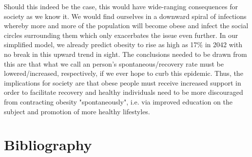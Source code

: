 \documentclass[11pt]{article}
\begin{document}
Should this indeed be the case, this would have wide-ranging consequences for society as we know it. We would find ourselves in a downward spiral of infections whereby more and more of the population will become obese and infect the social circles surrounding them which only exacerbates the issue even further. In our simplified model, we already predict obesity to rise as high as 17\% in 2042 with no break in this upward trend in sight. The conclusions needed to be drawn from this are that what we call an person's spontaneous/recovery rate must be lowered/increased, respectively, if we ever hope to curb this epidemic. Thus, the implications for society are that obese people must receive increased support in order to facilitate recovery and healthy individuals need to be more discouraged from contracting obesity "spontaneously", i.e. via improved education on the subject and promotion of more healthy lifestyles. 

\newpage

\section{Bibliography}



\end{document}
